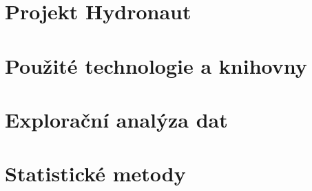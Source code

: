 

\section{Projekt Hydronaut}
\label{sec:projekt_hydronaut}


\section{Použité technologie a knihovny}
\label{sec:technologie_a_knihovny}


\section{Explorační analýza dat}
\label{sec:_exploracni_analyza}


\section{Statistické metody}
\label{sec:_statisticke_metody}
